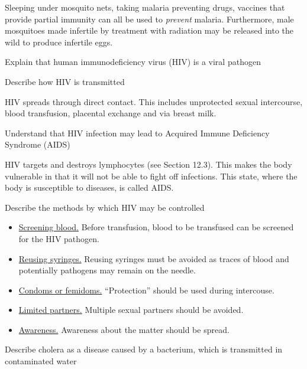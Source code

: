 Sleeping under mosquito nets, taking malaria preventing drugs, vaccines that provide partial
immunity can all be used to \emph{prevent} malaria. Furthermore, male mosquitoes made infertile
by treatment with radiation may be released into the wild to produce infertile eggs.

\begin{point}
Explain that human immunodeficiency virus (HIV) is a viral pathogen
\end{point}

\begin{point}
Describe how HIV is transmitted
\end{point}

HIV spreads through direct contact. This includes unprotected sexual intercourse, blood 
transfusion, placental exchange and via breast milk.

\begin{point}
Understand that HIV infection may lead to Acquired Immune Deficiency Syndrome (AIDS)
\end{point}

HIV targets and destroys lymphocytes (see Section 12.3). This makes the body vulnerable in that
it will not be able to fight off infections. This state, where the body is susceptible to 
diseases, is called AIDS.

\newpage
\begin{point}
Describe the methods by which HIV may be controlled
\end{point}

\begin{itemize}
\item\ul{Screening blood.} Before transfusion, blood to be transfused can be screened for the
HIV pathogen.

\item\ul{Reusing syringes.} Reusing syringes must be avoided as traces of blood and potentially
pathogens may remain on the needle.

\item\ul{Condoms or femidoms.} ``Protection'' should be used during intercouse.

\item\ul{Limited partners.} Multiple sexual partners should be avoided.

\item\ul{Awareness.} Awareness about the matter should be spread.
\end{itemize}

\begin{point}
Describe cholera as a disease caused by a bacterium, which is transmitted in contaminated water
\end{point}

